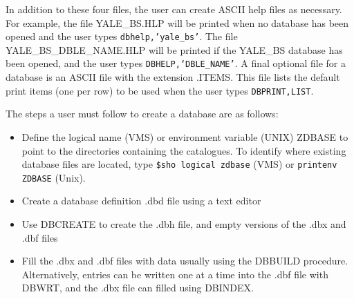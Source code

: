 In addition to these four files, the user can create ASCII help files as
necessary.  For example, the file YALE\_BS.HLP will be printed when no database
has been opened and the user types {\tt dbhelp,'yale\_bs'}.  The file 
YALE\_BS\_DBLE\_NAME.HLP will be printed if the YALE\_BS database has been 
opened, and the user types {\tt DBHELP,`DBLE\_NAME'}.     A final optional
file for a database is an ASCII file with the extension .ITEMS.     This
file lists the default print items (one per row) to  be used when the
user types {\tt DBPRINT,LIST}.


The steps a user must follow to create a database are as follows:
\begin{itemize}
\item Define the logical name (VMS) or environment variable (UNIX) 
ZDBASE to point to the directories containing
the catalogues.   To identify where existing database files are located, 
type {\tt \$sho logical zdbase} (VMS) or {\tt printenv ZDBASE} (Unix).
\item Create a database definition .dbd file using a text editor
\item Use DBCREATE to create the .dbh file, and empty versions of the .dbx
and .dbf files
\item Fill the .dbx and .dbf files with data usually using the DBBUILD
procedure.  Alternatively, entries can be written one at a time into the
.dbf file with DBWRT, and the .dbx file can filled using DBINDEX.
\end{itemize}

